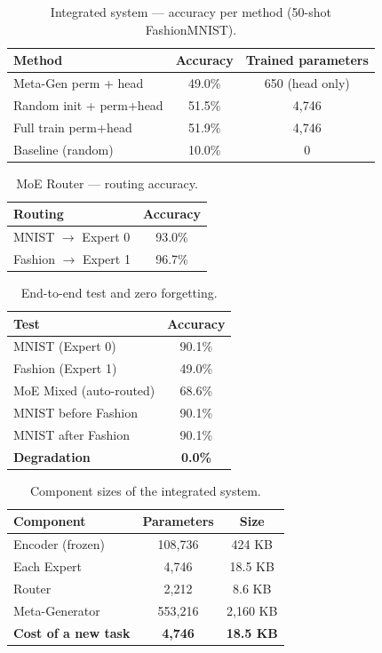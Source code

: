 \begin{table}[h!]
\centering
\caption{Integrated system --- accuracy per method (50-shot FashionMNIST).}
\begin{tabular}{l c c}
\hline
\textbf{Method} & \textbf{Accuracy} & \textbf{Trained parameters} \\
\hline
Meta-Gen perm + head & 49.0\% & 650 (head only) \\
Random init + perm+head & 51.5\% & 4,746 \\
Full train perm+head & 51.9\% & 4,746 \\
Baseline (random) & 10.0\% & 0 \\
\hline
\end{tabular}
\label{tab:integrated_fashion}
\end{table}

\begin{table}[h!]
\centering
\caption{MoE Router --- routing accuracy.}
\begin{tabular}{l c}
\hline
\textbf{Routing} & \textbf{Accuracy} \\
\hline
MNIST $\to$ Expert 0 & 93.0\% \\
Fashion $\to$ Expert 1 & 96.7\% \\
\hline
\end{tabular}
\label{tab:integrated_router}
\end{table}

\begin{table}[h!]
\centering
\caption{End-to-end test and zero forgetting.}
\begin{tabular}{l c}
\hline
\textbf{Test} & \textbf{Accuracy} \\
\hline
MNIST (Expert 0) & 90.1\% \\
Fashion (Expert 1) & 49.0\% \\
MoE Mixed (auto-routed) & 68.6\% \\
\hline
MNIST before Fashion & 90.1\% \\
MNIST after Fashion & 90.1\% \\
\textbf{Degradation} & \textbf{0.0\%} \\
\hline
\end{tabular}
\label{tab:integrated_endtoend}
\end{table}

\begin{table}[h!]
\centering
\caption{Component sizes of the integrated system.}
\begin{tabular}{l c c}
\hline
\textbf{Component} & \textbf{Parameters} & \textbf{Size} \\
\hline
Encoder (frozen) & 108,736 & 424 KB \\
Each Expert & 4,746 & 18.5 KB \\
Router & 2,212 & 8.6 KB \\
Meta-Generator & 553,216 & 2,160 KB \\
\textbf{Cost of a new task} & \textbf{4,746} & \textbf{18.5 KB} \\
\hline
\end{tabular}
\label{tab:integrated_sizes}
\end{table}
